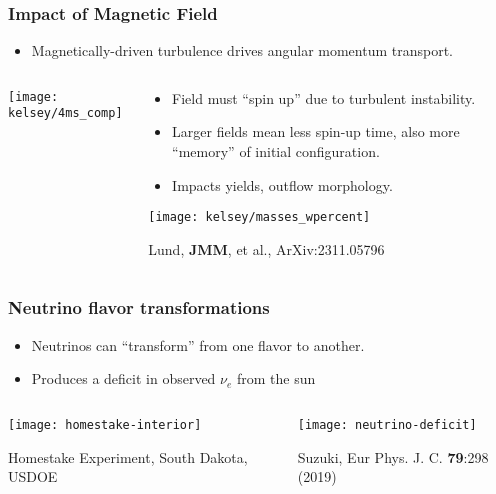 \documentclass[]{beamer}
\begin{document}
\begin{frame}
  \frametitle{Impact of Magnetic Field}
  \begin{itemize}
  \item Magnetically-driven turbulence drives angular momentum transport.
  \end{itemize}
  \begin{columns}
    \begin{column}{2.5cm}
      \begin{center}
        \texttt{[image: kelsey/4ms\_comp]}
      \end{center}
    \end{column}
    \begin{column}{9.5cm}
      \begin{itemize}
      \item Field must ``spin up'' due to turbulent instability.
      \item Larger fields mean less spin-up time, also more ``memory''
        of initial configuration.
      \item Impacts yields, outflow morphology.
      \end{itemize}
      \begin{center}
        \texttt{[image: kelsey/masses\_wpercent]}
      \end{center}
      {\footnotesize Lund, \textbf{JMM}, et al., ArXiv:2311.05796}
    \end{column}
  \end{columns}
\end{frame}

\begin{frame}
  \frametitle{Neutrino flavor transformations}
  \begin{itemize}
  \item Neutrinos can ``transform'' from one flavor to another.
  \item Produces a deficit in observed $\nu_e$ from the sun
  \end{itemize}
  \begin{columns}
    \begin{column}{6cm}
      \begin{center}
        \texttt{[image: homestake-interior]}
      \end{center}
      Homestake Experiment, South Dakota, USDOE
    \end{column}
    \begin{column}{6cm}
      \begin{center}
        \texttt{[image: neutrino-deficit]}
      \end{center}
      Suzuki, Eur Phys. J. C. \textbf{79}:298 (2019)
    \end{column}
  \end{columns}
\end{frame}
\end{document}
